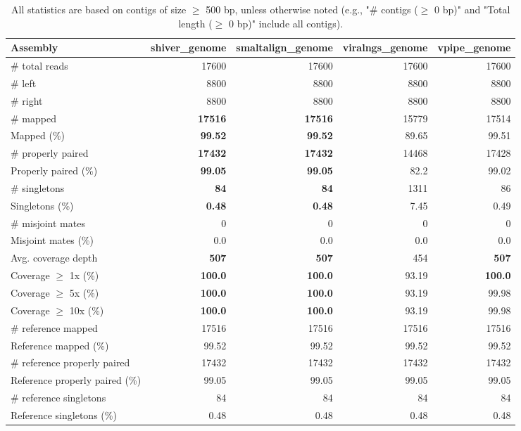 \documentclass[12pt,a4paper]{article}
\begin{document}
\begin{table}[ht]
\begin{center}
\caption{All statistics are based on contigs of size $\geq$ 500 bp, unless otherwise noted (e.g., "\# contigs ($\geq$ 0 bp)" and "Total length ($\geq$ 0 bp)" include all contigs).}
\begin{tabular}{|l*{4}{|r}|}
\hline
Assembly & shiver\_genome & smaltalign\_genome & viralngs\_genome & vpipe\_genome \\ \hline
\# total reads & 17600 & 17600 & 17600 & 17600 \\ \hline
\# left & 8800 & 8800 & 8800 & 8800 \\ \hline
\# right & 8800 & 8800 & 8800 & 8800 \\ \hline
\# mapped & {\bf 17516} & {\bf 17516} & 15779 & 17514 \\ \hline
Mapped (\%) & {\bf 99.52} & {\bf 99.52} & 89.65 & 99.51 \\ \hline
\# properly paired & {\bf 17432} & {\bf 17432} & 14468 & 17428 \\ \hline
Properly paired (\%) & {\bf 99.05} & {\bf 99.05} & 82.2 & 99.02 \\ \hline
\# singletons & {\bf 84} & {\bf 84} & 1311 & 86 \\ \hline
Singletons (\%) & {\bf 0.48} & {\bf 0.48} & 7.45 & 0.49 \\ \hline
\# misjoint mates & 0 & 0 & 0 & 0 \\ \hline
Misjoint mates (\%) & 0.0 & 0.0 & 0.0 & 0.0 \\ \hline
Avg. coverage depth & {\bf 507} & {\bf 507} & 454 & {\bf 507} \\ \hline
Coverage $\geq$ 1x (\%) & {\bf 100.0} & {\bf 100.0} & 93.19 & {\bf 100.0} \\ \hline
Coverage $\geq$ 5x (\%) & {\bf 100.0} & {\bf 100.0} & 93.19 & 99.98 \\ \hline
Coverage $\geq$ 10x (\%) & {\bf 100.0} & {\bf 100.0} & 93.19 & 99.98 \\ \hline
\# reference mapped & 17516 & 17516 & 17516 & 17516 \\ \hline
Reference mapped (\%) & 99.52 & 99.52 & 99.52 & 99.52 \\ \hline
\# reference properly paired & 17432 & 17432 & 17432 & 17432 \\ \hline
Reference properly paired (\%) & 99.05 & 99.05 & 99.05 & 99.05 \\ \hline
\# reference singletons & 84 & 84 & 84 & 84 \\ \hline
Reference singletons (\%) & 0.48 & 0.48 & 0.48 & 0.48 \\ \hline

\end{tabular}
\end{center}
\end{table}
\end{document}
